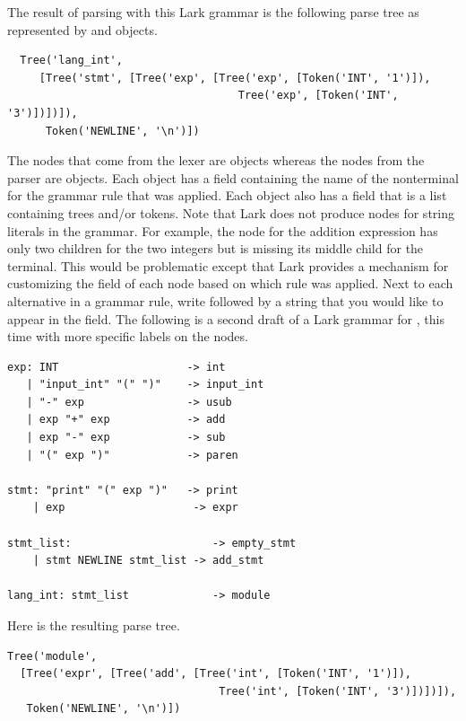 \documentclass[7x10]{TimesAPriori_MIT}%
\numberwithin{theorem}{chapter}
\numberwithin{definition}{chapter}
\numberwithin{equation}{chapter}
\begin{document}
{The result of parsing  with this Lark grammar is the
following parse tree as represented by  and 
objects.
\begin{lstlisting}
  Tree('lang_int',
     [Tree('stmt', [Tree('exp', [Tree('exp', [Token('INT', '1')]),
                                    Tree('exp', [Token('INT', '3')])])]),
      Token('NEWLINE', '\n')])
\end{lstlisting}
The nodes that come from the lexer are  objects whereas
the nodes from the parser are  objects.  Each 
object has a  field containing the name of the nonterminal
for the grammar rule that was applied. Each  object also
has a  field that is a list containing trees and/or
tokens. Note that Lark does not produce nodes for string literals in
the grammar. For example, the  node for the addition
expression has only two children for the two integers but is missing
its middle child for the  terminal. This would be
problematic except that Lark provides a mechanism for customizing the
 field of each  node based on which rule was
applied.  Next to each alternative in a grammar rule, write \code{->}
followed by a string that you would like to appear in the 
field.  The following is a second draft of a Lark grammar for
\LangInt{}, this time with more specific labels on the 
nodes.
\begin{center}
\begin{minipage}{0.95\textwidth}
\begin{lstlisting}[escapechar=$]
exp: INT                    -> int
   | "input_int" "(" ")"    -> input_int
   | "-" exp                -> usub
   | exp "+" exp            -> add
   | exp "-" exp            -> sub
   | "(" exp ")"            -> paren

stmt: "print" "(" exp ")"   -> print
    | exp                    -> expr

stmt_list:                      -> empty_stmt
    | stmt NEWLINE stmt_list -> add_stmt

lang_int: stmt_list             -> module
\end{lstlisting}
\end{minipage}
\end{center}
Here is the resulting parse tree. 
\begin{lstlisting}
Tree('module',
  [Tree('expr', [Tree('add', [Tree('int', [Token('INT', '1')]),
                                 Tree('int', [Token('INT', '3')])])]),
   Token('NEWLINE', '\n')])
\end{lstlisting}

}
\end{document}
